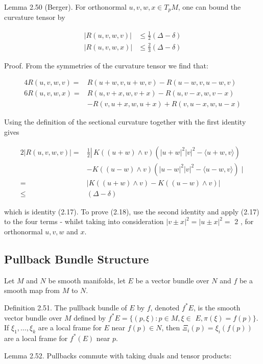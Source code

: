 \documentclass[10pt, letterpaper]{article}
\begin{document}
Lemma 2.50 (Berger). For orthonormal $u, v, w, x \in T_{p} M$, one can bound the curvature tensor by

$$
\begin{aligned}
|R(u, v, w, v)| & \leq \frac{1}{2}(\Delta-\delta) \\
|R(u, v, w, x)| & \leq \frac{2}{3}(\Delta-\delta)
\end{aligned}
$$

Proof. From the symmetries of the curvature tensor we find that:

$$
\begin{aligned}
4 R(u, v, w, v)= & R(u+w, v, u+w, v)-R(u-w, v, u-w, v) \\
6 R(u, v, w, x)= & R(u, v+x, w, v+x)-R(u, v-x, w, v-x) \\
& -R(v, u+x, w, u+x)+R(v, u-x, w, u-x)
\end{aligned}
$$

Using the definition of the sectional curvature together with the first identity gives

$$
\begin{aligned}
2|R(u, v, w, v)|= & \left.\frac{1}{2} \right\rvert\, K((u+w) \wedge v)\left(|u+w|^{2}|v|^{2}-\langle u+w, v\rangle\right) \\
& -K((u-w) \wedge v)\left(|u-w|^{2}|v|^{2}-\langle u-w, v\rangle\right) \mid \\
= & |K((u+w) \wedge v)-K((u-w) \wedge v)| \\
\leq & (\Delta-\delta)
\end{aligned}
$$

which is identity (2.17). To prove (2.18), use the second identity and apply (2.17) to the four terms - whilst taking into consideration $|v \pm x|^{2}=|u \pm x|^{2}=$ 2 , for orthonormal $u, v, w$ and $x$.

\subsection*{Pullback Bundle Structure}
Let $M$ and $N$ be smooth manifolds, let $E$ be a vector bundle over $N$ and $f$ be a smooth map from $M$ to $N$.

Definition 2.51. The pullback bundle of $E$ by $f$, denoted $f^{*} E$, is the smooth vector bundle over $M$ defined by $f^{*} E=\{(p, \xi): p \in M, \xi \in$ $E, \pi(\xi)=f(p)\}$. If $\xi_{1}, \ldots, \xi_{k}$ are a local frame for $E$ near $f(p) \in N$, then $\Xi_{i}(p)=\xi_{i}(f(p))$ are a local frame for $f^{*}(E)$ near $p$.

Lemma 2.52. Pullbacks commute with taking duals and tensor products:
\end{document}
